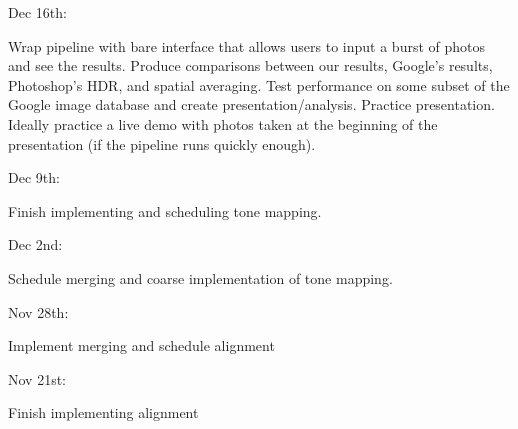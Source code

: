 \documentclass[12pt]{exam}
\newcommand{\sol}[1]{\leavevmode \begin{solution} #1 \end{solution}}
\begin{document}
\begin{questions}
    \sol{
    
    Dec 16th:
    
        \hspace{.2 in} Wrap pipeline with bare interface that allows users to input a burst of photos and see the results. Produce comparisons between our results, Google's results, Photoshop's HDR, and spatial averaging. Test performance on some subset of the Google image database and create presentation/analysis. Practice presentation. Ideally practice a live demo with photos taken at the beginning of the presentation (if the pipeline runs quickly enough).
    
    Dec 9th:
    
        \hspace{.2 in} Finish implementing and scheduling tone mapping.
    
    Dec 2nd: 

        \hspace{.2 in} Schedule merging and coarse implementation of tone mapping.
    
    Nov 28th:

        \hspace{.2 in} Implement merging and schedule alignment

    Nov 21st: 

        \hspace{.2 in} Finish implementing alignment

    }
    
\end{questions}
\end{document}
